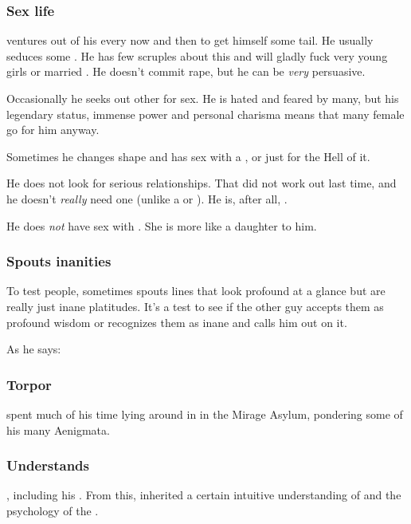 \subsubsection{Sex life}
\Ishnaruchaefir{} ventures out of his  every now and then to get himself some tail. 
He usually seduces some \sphyle. 
He has few scruples about this and will gladly fuck very young girls or married \sphyles. 
He doesn't commit rape, but he can be \emph{very} persuasive. 

Occasionally he seeks out other \dragons{} for sex. 
He is hated and feared by many, but his legendary status, immense power and personal charisma means that many female \dragons{} go for him anyway. 

Sometimes he changes shape and has sex with a \resvil, \human{} or \nephil{} just for the Hell of it. 

He does not look for serious relationships. 
That did not work out last time, and he doesn't \emph{really} need one (unlike a \human{} or \scatha). 
He is, after all, . 

He does \emph{not} have sex with . 
She is more like a daughter to him. 





\subsubsection{Spouts inanities}
To test people, \Ishnaruchaefir{} sometimes spouts lines that look profound at a glance but are really just inane platitudes. It's a test to see if the other guy accepts them as profound wisdom or recognizes them as inane and calls him out on it. 

As he says: 





\subsubsection{Torpor}
\Ishnaruchaefir{} spent much of his time lying around in  in the Mirage Asylum, pondering some of his many Aenigmata. 





\subsubsection{Understands \NexagglachelsCurse}
\Ishnaruchaefir{} , including his . 
From this, \Ishnaruchaefir{} {inherited a certain intuitive understanding} of  and the psychology of the \satharioth. 

